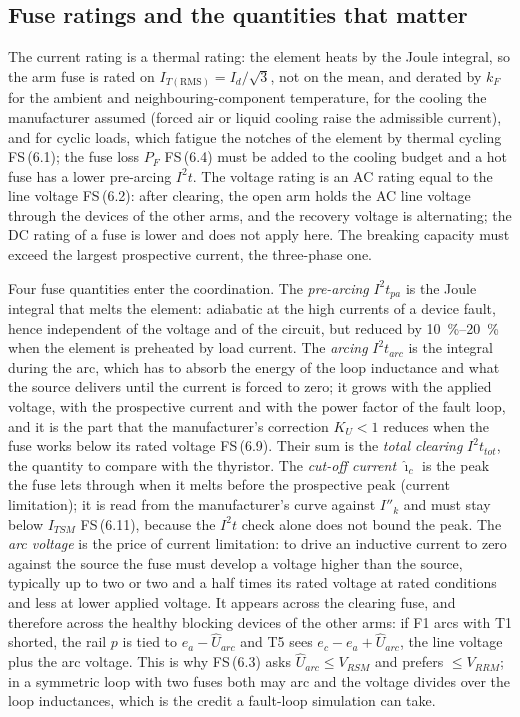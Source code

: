 \documentclass[10pt,a4paper]{scrartcl}
\newcommand{\Id}{I_{d}}
\newcommand{\ITrms}{I_{T\mathrm{(RMS)}}}
\newcommand{\ITSM}{I_{TSM}}
\newcommand{\VRRM}{V_{RRM}}
\newcommand{\VRSM}{V_{RSM}}
\newcommand{\iit}{I^{2}t}
\newcommand{\fs}[1]{\textsf{FS}\,(#1)}
\begin{document}
\subsection{Fuse ratings and the quantities that matter}\label{sec:arc}
The current rating is a thermal rating: the element heats by the Joule integral, so the arm fuse is rated on $\ITrms = \Id/\sqrt3$, not on the mean, and derated by $k_F$ for the ambient and neighbouring-component temperature, for the cooling the manufacturer assumed (forced air or liquid cooling raise the admissible current), and for cyclic loads, which fatigue the notches of the element by thermal cycling \fs{6.1}; the fuse loss $P_F$ \fs{6.4} must be added to the cooling budget and a hot fuse has a lower pre-arcing $\iit$. The voltage rating is an AC rating equal to the line voltage \fs{6.2}: after clearing, the open arm holds the AC line voltage through the devices of the other arms, and the recovery voltage is alternating; the DC rating of a fuse is lower and does not apply here. The breaking capacity must exceed the largest prospective current, the three-phase one.

Four fuse quantities enter the coordination. The \emph{pre-arcing} $\iit_{pa}$ is the Joule integral that melts the element: adiabatic at the high currents of a device fault, hence independent of the voltage and of the circuit, but reduced by \SIrange{10}{20}{\percent} when the element is preheated by load current. The \emph{arcing} $\iit_{arc}$ is the integral during the arc, which has to absorb the energy of the loop inductance and what the source delivers until the current is forced to zero; it grows with the applied voltage, with the prospective current and with the power factor of the fault loop, and it is the part that the manufacturer's correction $K_U<1$ reduces when the fuse works below its rated voltage \fs{6.9}. Their sum is the \emph{total clearing} $\iit_{tot}$, the quantity to compare with the thyristor. The \emph{cut-off current} $\hat\imath_c$ is the peak the fuse lets through when it melts before the prospective peak (current limitation); it is read from the manufacturer's curve against $I''_k$ and must stay below $\ITSM$ \fs{6.11}, because the $\iit$ check alone does not bound the peak. The \emph{arc voltage} is the price of current limitation: to drive an inductive current to zero against the source the fuse must develop a voltage higher than the source, typically up to two or two and a half times its rated voltage at rated conditions and less at lower applied voltage. It appears across the clearing fuse, and therefore across the healthy blocking devices of the other arms: if F1 arcs with T1 shorted, the rail $p$ is tied to $e_a - \hat U_{arc}$ and T5 sees $e_c - e_a + \hat U_{arc}$, the line voltage plus the arc voltage. This is why \fs{6.3} asks $\hat U_{arc}\le\VRSM$ and prefers $\le\VRRM$; in a symmetric loop with two fuses both may arc and the voltage divides over the loop inductances, which is the credit a fault-loop simulation can take.
\end{document}
